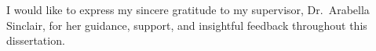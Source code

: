 \documentclass[12pt]{report}
\numberwithin{figure}{chapter}
\numberwithin{table}{chapter}
\numberwithin{equation}{chapter}
\begin{document}
I would like to express my sincere gratitude to my supervisor, Dr.\ Arabella Sinclair, for her guidance, support, and insightful feedback throughout this dissertation.








\newpage
{}
\printbibliography[title={Bibliography}]
\thispagestyle{fancy}
\end{document}
